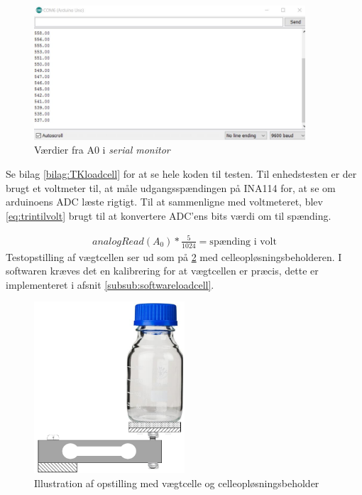 \begin{figure}[H]
	\centering
	\includegraphics[width=0.9\textwidth]{billeder/Hardware/diagrammer/loadcellunittestbits.JPG}
	\caption{Værdier fra A0 i \textit{serial monitor}}
	\label{fig:loadcell_test}
\end{figure}

 Se bilag \ref{bilag:TKloadcell} for at se hele koden til testen. Til enhedstesten er der brugt et voltmeter til, at måle udgangsspændingen på INA114 for, at se om arduinoens ADC læste rigtigt. Til at sammenligne med voltmeteret, blev \ref{eq:trintilvolt} brugt til at konvertere ADC'ens bits værdi om til spænding.
 
 \begin{align}
 analogRead(A_0)*\frac{5}{1024}=\text{spænding i volt}
 \label{eq:trintilvolt}
 \end{align}
Testopstilling af vægtcellen ser ud som på \ref{fig:loadcell_mont} med celleopløsningsbeholderen. I softwaren kræves det en kalibrering for at vægtcellen er præcis, dette er implementeret i afsnit \ref{subsub:softwareloadcell}.
 
 \begin{figure}[H]
	\centering
	\includegraphics[width=0.5\textwidth]{billeder/Hardware/diagrammer/loadcell_montering.pdf}
	\caption{Illustration af opstilling med vægtcelle og celleopløsningsbeholder}
	\label{fig:loadcell_mont}
\end{figure}

